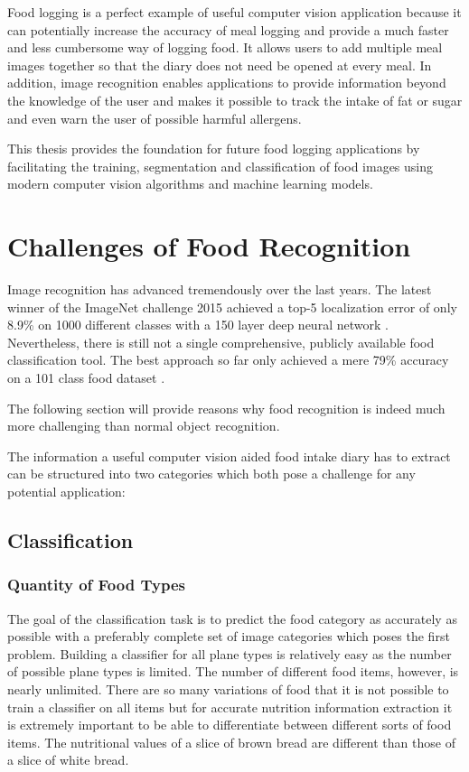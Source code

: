 Food logging is a perfect example of useful computer vision application because it can potentially increase the accuracy of meal logging and provide a much faster and less cumbersome way of logging food. It allows users to add multiple meal images together so that the diary does not need be opened at every meal. In addition, image recognition enables applications to provide information beyond the knowledge of the user and makes it possible to track the intake of fat or sugar and even warn the user of possible harmful allergens.

This thesis provides the foundation for future food logging applications by facilitating the training, segmentation and classification of food images using modern computer vision algorithms and machine learning models.

\section{Challenges of Food Recognition}
\label{sec:introduction_challenges}

Image recognition has advanced tremendously over the last years. The latest winner of the ImageNet challenge 2015 \cite{Russakovsky2015} achieved a top-5 localization error of only 8.9\% on 1000 different classes with a 150 layer deep neural network \cite{He2015}. Nevertheless, there is still not a single comprehensive, publicly available food classification tool. The best approach so far only achieved a mere 79\% accuracy on a 101 class food dataset \cite{Meyers2015}.

The following section will provide reasons why food recognition is indeed much more challenging than normal object recognition.

The information a useful computer vision aided food intake diary has to extract can be structured into two categories which both pose a challenge for any potential application:

\subsection*{Classification}

\subsubsection{Quantity of Food Types}
The goal of the classification task is to predict the food category as accurately as possible with a preferably complete set of image categories which poses the first problem. Building a classifier for all plane types is relatively easy as the number of possible plane types is limited. The number of different food items, however, is nearly unlimited. There are so many variations of food that it is not possible to train a classifier on all items but for accurate nutrition information extraction it is extremely important to be able to differentiate between different sorts of food items. The nutritional values of a slice of brown bread are different than those of a slice of white bread.

